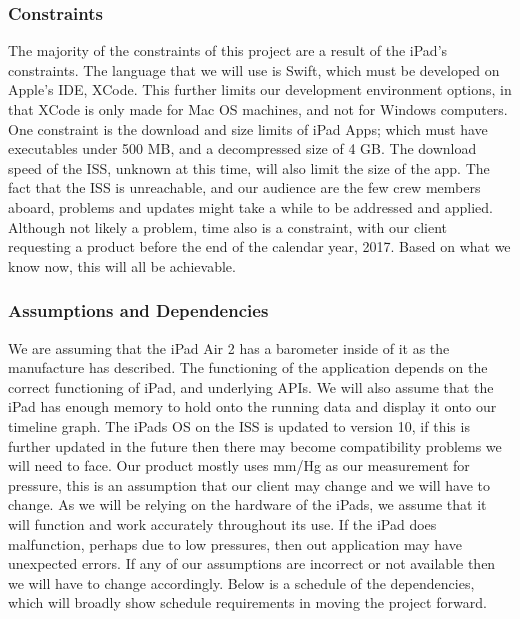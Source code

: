 \documentclass[onecolumn, draftclsnofoot,10pt, compsoc]{IEEEtran}
\begin{document}
\subsubsection{Constraints}
The majority of the constraints of this project are a result of the iPad's constraints.
The language that we will use is Swift, which must be developed on Apple's IDE, XCode.
This further limits our development environment options, in that XCode is only made for Mac OS machines, and not for Windows computers.
One constraint is the download and size limits of iPad Apps; which must have executables under 500 MB, and a decompressed size of 4 GB.
The download speed of the ISS, unknown at this time, will also limit the size of the app.
The fact that the ISS is unreachable, and our audience are the few crew members aboard, problems and updates might take a while to be addressed and applied.
Although not likely a problem, time also is a constraint, with our client requesting a product before the end of the calendar year, 2017.
Based on what we know now, this will all be achievable.

\subsubsection{Assumptions and Dependencies}
We are assuming that the iPad Air 2 has a barometer inside of it as the manufacture has described.
The functioning of the application depends on the correct functioning of iPad, and underlying APIs.
We will also assume that the iPad has enough memory to hold onto the running data and display it onto our timeline graph.
The iPads OS on the ISS is updated to version 10, if this is further updated in the future then there may become compatibility problems we will need to face.
Our product mostly uses mm/Hg as our measurement for pressure, this is an assumption that our client may change and we will have to change.
As we will be relying on the hardware of the iPads, we assume that it will function and work accurately throughout its use.
If the iPad does malfunction, perhaps due to low pressures, then out application may have unexpected errors.
If any of our assumptions are incorrect or not available then we will have to change accordingly.
Below is a schedule of the dependencies, which will broadly show schedule requirements in moving the project forward.
\end{document}
